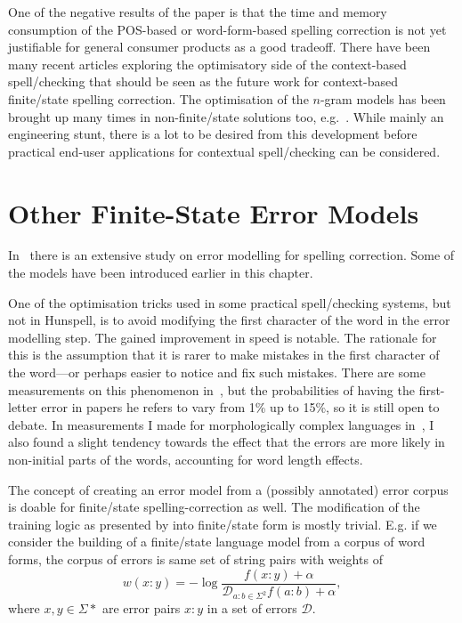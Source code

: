 \documentclass[officiallayout]{unihelcompling}
\begin{document}
One of the negative results of the paper is that the time and memory
consumption of the POS-based or word-form-based spelling correction is not yet
justifiable for general consumer products as a good tradeoff. There have been
many recent articles exploring the optimisatory side of the context-based
spell\-/checking that should be seen as the future work for context-based
finite\-/state spelling correction. The optimisation of the \(n\)-gram models has
been brought up many times in non-finite\-/state solutions too,
e.g.~\citet{church2007compressing}. While mainly an engineering stunt, there is
a lot to be desired from this development before practical end-user
applications for contextual spell\-/checking can be considered.

\section{Other Finite-State Error Models}
\label{sec:other-errors}

In~\citet{deorowicz2005correcting} there is an extensive study on error
modelling for spelling correction. Some of the models have been
introduced earlier in this chapter.

One of the optimisation tricks used in some practical spell\-/checking systems,
but not in Hunspell, is to avoid modifying the first character of the word in
the error modelling step. The gained improvement in speed is notable. The
rationale for this is the assumption that it is rarer to make mistakes in the
first character of the word---or perhaps easier to notice and fix such
mistakes. There are some measurements on this phenomenon
in~\citet{bhagat2007spelling}, but the probabilities of having the first-letter
error in papers he refers to vary from 1\% up to 15\%, so it is still open to
debate. In measurements I made for morphologically complex languages
in~, I also found a slight tendency towards
the effect that the errors are more likely in non-initial parts of the words,
accounting for word length effects.

The concept of creating an error model from a (possibly annotated) error corpus
is doable for finite\-/state spelling-correction as well. The modification of
the training logic as presented by \citep{church1991probability} into
finite\-/state form is mostly trivial. E.g. if we consider the building of a
finite\-/state language model from a corpus of word forms, the corpus of errors
is same set of string pairs with weights of 
\begin{equation}
    w(x:y) = -\log\frac{f(x:y) + \alpha}{\mathcal{D}_{a:b \in \Sigma^2} f(a:b) + \alpha},
\end{equation}
where $x, y \in \Sigma*$ are error pairs $x:y$ in a set of errors
$\mathcal{D}$.
\end{document}
